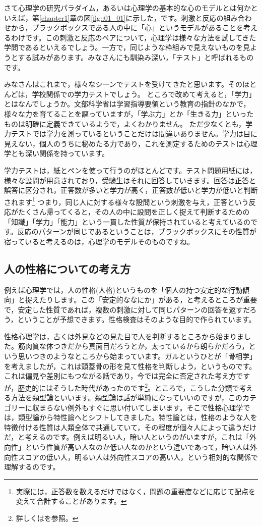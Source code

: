 \documentclass{ltjbook}
\begin{document}
さて心理学の研究パラダイム，あるいは心理学の基本的な心のモデルとは何かといえば，第\ref{chapter1}章の図\ref{fig::01_01}に示した，です。刺激と反応の組み合わせから，ブラックボックスである人の中に「心」というモデルがあることを考えるわけです。この刺激と反応のペアについて，心理学は様々な方法を試してきた学問であるといえるでしょう。一方で，同じような枠組みで見えないものを見ようとする試みがあります。みなさんにも馴染み深い，「テスト」と呼ばれるものです。

みなさんはこれまで，様々なシーンでテストを受けてきたと思います。そのほとんどは，学校関係での学力テストでしょう。
ところで改めて考えると，「学力」とはなんでしょうか。文部科学省は学習指導要領という教育の指針のなかで，様々な力を育てることを謳っていますが，「学ぶ力」とか「生きる力」といったものは明確に定義できているようで，よくわかりません。
ただ少なくとも，学力テストでは学力を測っているということだけは間違いありません。学力は目に見えない，個人のうちに秘めたる力であり，これを測定するためのテストは心理学とも深い関係を持っています。

学力テストは，紙とペンを使って行うのがほとんどです。テスト問題用紙には，様々な設問が用意されており，受験生はそれに回答していきます。回答は正答と誤答に区分され，正答数が多いと学力が高く，正答数が低いと学力が低いと判断されます\footnote{実際には，正答数を数えるだけではなく，問題の重要度などに応じて配点を変えて合計することがあります。}
つまり，同じ人に対する様々な設問という刺激を与え，正答という反応がたくさん帰ってくると，その人の中に設問を正しく捉えて判断するための「知識」「学力」「能力」という一貫した性質が保持されていると考えているのです。反応のパターンが同じであるということは，ブラックボックスにその性質が宿っていると考えるのは，心理学のモデルそのものですね。

\subsection{人の性格についての考え方}
例えば心理学では，人の性格(人格)というものを「個人の持つ安定的な行動傾向」と捉えたりします。この「安定的ななにか」がある，と考えるところが重要で，安定した性質であれば，複数の刺激に対して同じパターンの回答を返すだろう，ということが予想できます。性格検査はそのような目的で作られています。

性格心理学は，古くは外見などの見た目で人を判断するところから始まりました。筋肉質な体つきだから真面目だろうとか，太っているから朗らかだろう，という思いつきのようなところから始まっています。ガルというひとが「骨相学」を考えましたが，これは頭蓋骨の形を見て性格を判断しよう，というものです。これは偏見や差別にもつながる話であり，今では完全に否定された考え方ですが，歴史的にはそうした時代があったのです\footnote{詳しくは\citet{渡辺茂2019}を参照。}。ところで，こうした分類で考える方法を類型論といいます。類型論は話が単純になっていいのですが，このカテゴリーに収まらない例外もすぐに思い付いてしまいます。そこで性格心理学では，類型論から特性論へとシフトしてきました。特性論とは，性格のような人を特徴付ける性質は人類全体で共通していて，その程度が個々人によって違うだけだ，と考えるのです。例えば明るい人，暗い人というのがいますが，これは「外向性」という性質が高い人なのか低い人なのかという違いであって，暗い人は外向性スコアの低い人，明るい人は外向性スコアの高い人，という相対的な関係で理解するのです\citep{小塩2020}。
\end{document}
